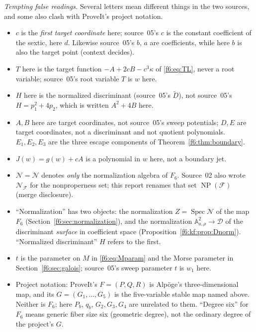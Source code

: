 \documentclass[11pt,a4paper]{article}
\theoremstyle{definition}
\newcommand{\A}{\mathbb A}
\newcommand{\Spec}{\operatorname{Spec}}
\newcommand{\F}{\mathcal F}
\newcommand{\normal}{\mathcal N}
\newcommand{\kk}{\kappa}
\newcommand{\NP}{\operatorname{NP}}
\newcommand{\dd}{\mathcal D}
\begin{document}
\emph{Tempting false readings.} Several letters mean different things in the
two sources, and some also clash with ProveIt's project notation.
\begin{itemize}
\item $c$ is the \emph{first target coordinate} here; source~05's $c$ is the
constant coefficient of the sextic, here $d$. Likewise source~05's $b$, $a$
are coefficients, while here $b$ is also the target point (context decides).
\item $T$ here is the target function $-A+2cB-c^3\kk$ of \eqref{f6:eq:TL},
never a root variable; source~05's root variable $T$ is $w$ here.
\item $H$ here is the normalized discriminant (source~05's $\widetilde D$),
not source~05's $H=p_1^2+4p_2$, which is written $A^2+4B$ here.
\item $A,B$ here are target coordinates, not source~05's sweep potentials;
$D,E$ are target coordinates, not a discriminant and not quotient
polynomials. $E_1,E_2,E_3$ are the three escape components of
Theorem~\ref{f6:thm:boundary}.
\item $J(w)=g(w)+cA$ is a polynomial in $w$ here, not a boundary jet.
\item $\normal=\mathcal N$ denotes \emph{only} the normalization algebra of
$F_6$. Source~02 also wrote $\mathcal N_{\F}$ for the nonproperness set; this
report renames that set $\NP(\F)$ (merge disclosure).
\item ``Normalization'' has two objects: the normalization $Z=\Spec\normal$ of
the map $F_6$ (Section~\ref{f6:sec:normalization}), and the normalization
$\A^2_{a,\rho}\to\dd$ of the discriminant \emph{surface} in coefficient space
(Proposition~\ref{f6:kf:prop:Dnorm}). ``Normalized discriminant'' $H$ refers
to the first.
\item $t$ is the parameter on $M$ in \eqref{f6:eq:Mparam} and the Morse
parameter in Section~\ref{f6:sec:galois}; source~05's sweep parameter $t$ is
$w_1$ here.
\item Project notation: ProveIt's $F=(P,Q,R)$ is Alpöge's three-dimensional
map, and its $G=(G_1,\dots,G_5)$ is the five-variable stable map named above.
Neither is $F_6$; here $P_b$, $q_b$, $G_2,G_3,G_4$ are unrelated to them.
``Degree six'' for $F_6$ means generic fiber size six (geometric degree), not
the ordinary degree of the project's $G$.
\end{itemize}

\end{document}
